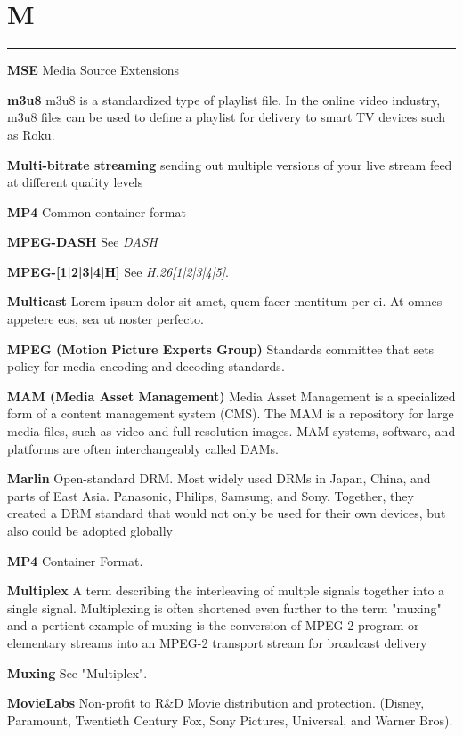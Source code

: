 \section{M}
\hrule

\medskip
\textbf{MSE}
Media Source Extensions

\smallskip
\textbf{m3u8}
m3u8 is a standardized type of playlist file. In the online video industry, m3u8 files can be used to define a playlist for delivery to smart TV devices such as Roku.

\smallskip
\textbf{Multi-bitrate streaming}
sending out multiple versions of your live stream feed at different quality levels

\smallskip
\textbf{MP4}
Common container format

\smallskip
\textbf{MPEG-DASH}
See \textit{DASH}

\smallskip
\textbf{MPEG-[1|2|3|4|H]}
See \textit{H.26[1|2|3|4|5]}.

\smallskip
\textbf{Multicast}
Lorem ipsum dolor sit amet, quem facer mentitum per ei. At omnes appetere eos, sea ut noster perfecto.

\smallskip
\textbf{MPEG (Motion Picture Experts Group)}
Standards committee that sets policy for media encoding and decoding standards.

\smallskip
\textbf{MAM (Media Asset Management)}
Media Asset Management is a specialized form of a content management system (CMS). The MAM is a repository for large media files, such as video and full-resolution images. MAM systems, software, and platforms are often interchangeably called DAMs.

\smallskip
\textbf{Marlin}
Open-standard DRM. Most widely used DRMs in Japan, China, and parts of East Asia. Panasonic, Philips, Samsung, and Sony. Together, they created a DRM standard that would not only be used for their own devices, but also could be adopted globally

\smallskip
\textbf{MP4}
Container Format.

\smallskip
\textbf{Multiplex}
A term describing the interleaving of multple signals together into a single signal. Multiplexing is often shortened even further to the term "muxing" and a pertient example of muxing is the conversion of MPEG-2 program or elementary streams into an MPEG-2 transport stream for broadcast delivery

\smallskip
\textbf{Muxing}
See "Multiplex".

\smallskip
\textbf{MovieLabs}
Non-profit to R\&D Movie distribution and protection. (Disney, Paramount, Twentieth Century Fox, Sony Pictures, Universal, and Warner Bros).

